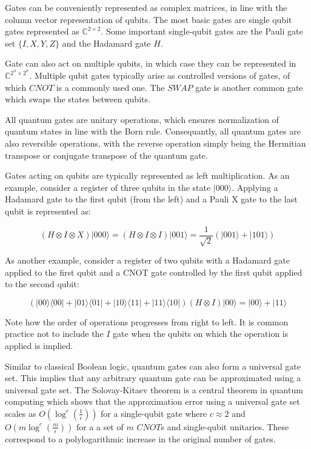 \documentclass{article}
\begin{document}
Gates can be conveniently represented as complex matrices, in line with the column vector representation of qubits. The most basic gates are single qubit gates represented as $\mathbb{C}^{2\times2}$. Some important single-qubit gates are  the Pauli gate set $\{I,X,Y,Z\}$ and the Hadamard gate $H$.

Gate can also act on multiple qubits, in which case they can be represented in $\mathbb{C}^{2^{n}\times2^{n}}$. Multiple qubit gates typically arise as controlled versions of gates, of which $CNOT$ is a commonly used one. The $SWAP$ gate is another common gate which swaps the states between qubits.

All quantum gates are unitary operations, which ensures normalization of quantum states in line with the Born rule. Consequantly, all quantum gates are also reversible operations, with the reverse operation simply being the Hermitian transpose or conjugate transpose of the quantum gate.

Gates acting on qubits are typically represented as left multiplication. As an example, consider a register of three qubits in the state $ \lvert 000 \rangle $. Applying a Hadamard gate to the first qubit (from the left) and a Pauli X gate to the last qubit is represented as:

\begin{equation}
(H\otimes I\otimes X) \lvert 000 \rangle = (H \otimes I \otimes I) \lvert 001 \rangle = \frac{1}{\sqrt{2}} (\lvert 001 \rangle + \lvert 101 \rangle)
\end{equation}

As another example, consider a  register of two qubits with a Hadamard gate applied to the first qubit and a CNOT gate controlled by the first qubit applied to the second qubit:

\begin{equation}
( \lvert 00 \rangle \langle 00 \rvert + 
\lvert 01 \rangle \langle 01 \rvert + 
\lvert 10 \rangle \langle 11 \rvert + 
\lvert 11 \rangle \langle 10 \rvert
 )(H \otimes I) \lvert 00 \rangle 
=
\lvert 00 \rangle + \lvert 11 \rangle 
\end{equation}

Note how the order of operations progresses from right to left. It is common practice not to include the $I$ gate when the qubits on which the operation is applied is implied.

Similar to classical Boolean logic, quantum gates can also form a universal gate set. This implies that any arbitrary quantum gate can be approximated using a universal gate set. The Solovay-Kitaev theorem is a central theorem in quantum computing which shows that the approximation error using a universal gate set scales as $ O (\log^c (\frac{1}{\epsilon}))$ for a single-qubit gate where $ c \approx 2$ and $O(m \log ^c (\frac{m}{\epsilon}))$ for a a set of $m$ $CNOT$s  and single-qubit unitaries. These correspond to a polylogarithmic increase in the original number of gates.
\end{document}
